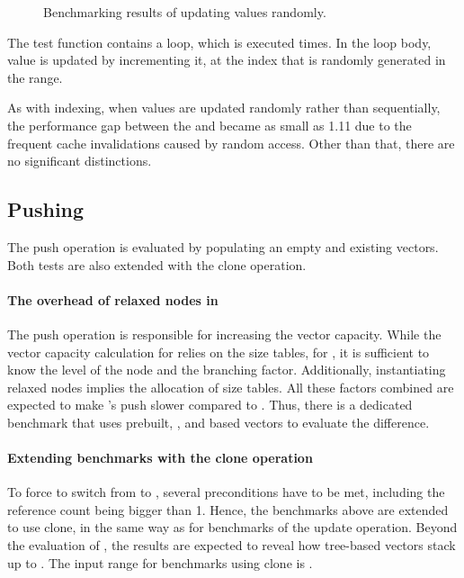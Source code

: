 \begin{figure}[!htbp]
    \caption{Benchmarking results of updating values randomly.}
    \label{fig:update-randomly}
\end{figure}

The test function contains a loop, which is executed \n{} times. In the loop body, value is updated by incrementing it, at the index that is randomly generated in the \range{[0, N)} range.

As with indexing, when values are updated randomly rather than sequentially, the performance gap between the \stdvec{} and \pvec{} became as small as 1.11 due to the frequent cache invalidations caused by random access. Other than that, there are no significant distinctions.

\subsection{Pushing}
The push operation is evaluated by populating an empty and existing vectors. Both tests are also extended with the clone operation.

\paragraph{The overhead of relaxed nodes in \rrbtree{}}
The push operation is responsible for increasing the vector capacity. While the vector capacity calculation for \rrbtree{} relies on the size tables, for \rbtree{}, it is sufficient to know the level of the node and the branching factor. Additionally, instantiating relaxed nodes implies the allocation of size tables. All these factors combined are expected to make \rrbtree{}'s push slower compared to \rbtree{}. Thus, there is a dedicated benchmark that uses prebuilt, \rrbtree{}, and \rbtree{} based vectors to evaluate the difference.

\paragraph{Extending benchmarks with the clone operation}
To force \pvec{} to switch from \stdvec{} to \rrbvec{}, several preconditions have to be met, including the reference count being bigger than 1. Hence, the benchmarks above are extended to use clone, in the same way as for benchmarks of the update operation. Beyond the evaluation of \pvec{}, the results are expected to reveal how tree-based vectors stack up to \stdvec{}. The input range for benchmarks using clone is \range{[20, \kilo{40}]}.

